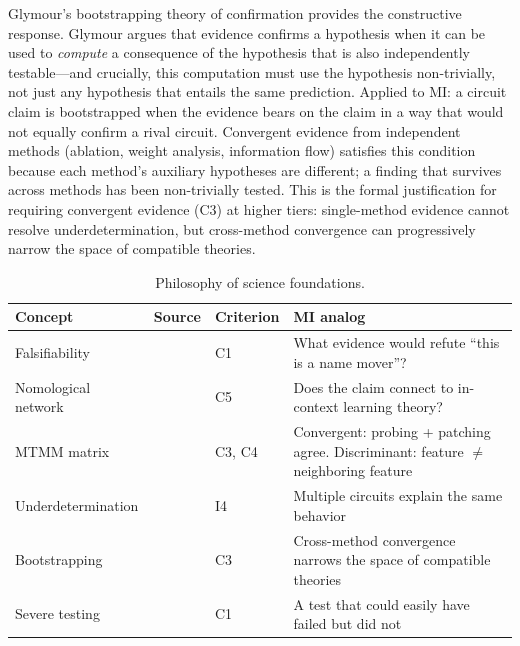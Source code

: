 \documentclass{article}
\begin{document}
Glymour's bootstrapping theory of confirmation \citep{glymour1980theory} provides the constructive response. Glymour argues that evidence confirms a hypothesis when it can be used to \emph{compute} a consequence of the hypothesis that is also independently testable---and crucially, this computation must use the hypothesis non-trivially, not just any hypothesis that entails the same prediction. Applied to MI: a circuit claim is bootstrapped when the evidence bears on the claim in a way that would not equally confirm a rival circuit. Convergent evidence from independent methods (ablation, weight analysis, information flow) satisfies this condition because each method's auxiliary hypotheses are different; a finding that survives across methods has been non-trivially tested. This is the formal justification for requiring convergent evidence (C3) at higher tiers: single-method evidence cannot resolve underdetermination, but cross-method convergence can progressively narrow the space of compatible theories.

\begin{table}[H]
\centering\small
\caption{Philosophy of science foundations.}
\renewcommand{\arraystretch}{1.12}
\begin{tabular}{@{}l>{\raggedright\arraybackslash}p{2cm}l>{\raggedright\arraybackslash}p{4.5cm}@{}}
\toprule
\textbf{Concept} & \textbf{Source} & \textbf{Criterion} & \textbf{MI analog} \\
\midrule
Falsifiability & \citet{popper1959logic} & C1 & What evidence would refute ``this is a name mover''? \\
\midrule
Nomological network & \citet{cronbach1955construct} & C5 & Does the claim connect to in-context learning theory? \\
\midrule
MTMM matrix & \citet{campbell1959convergent} & C3, C4 & Convergent: probing + patching agree. Discriminant: feature $\neq$ neighboring feature \\
\midrule
Underdetermination & \citet{quine1951two, duhem1906theorie} & I4 & Multiple circuits explain the same behavior \\
\midrule
Bootstrapping & \citet{glymour1980theory} & C3 & Cross-method convergence narrows the space of compatible theories \\
\midrule
Severe testing & \citet{mayo2018statistical} & C1 & A test that could easily have failed but did not \\
\bottomrule
\end{tabular}
\end{table}
\end{document}
